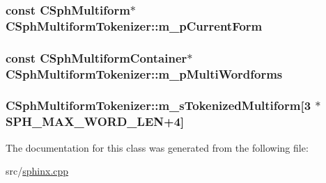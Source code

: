 \hypertarget{classCSphMultiformTokenizer_a37d850185d9bdf79433c4d01db6d462e}{
\subsubsection[{m\-\_\-p\-Current\-Form}]{\setlength{\rightskip}{0pt plus 5cm}const {\bf C\-Sph\-Multiform}$\ast$ C\-Sph\-Multiform\-Tokenizer\-::m\-\_\-p\-Current\-Form\hspace{0.3cm}{\ttfamily [private]}}}\label{classCSphMultiformTokenizer_a37d850185d9bdf79433c4d01db6d462e}
\hypertarget{classCSphMultiformTokenizer_a9e487f015bd6e629a35786dbd85ff482}{
\subsubsection[{m\-\_\-p\-Multi\-Wordforms}]{\setlength{\rightskip}{0pt plus 5cm}const {\bf C\-Sph\-Multiform\-Container}$\ast$ C\-Sph\-Multiform\-Tokenizer\-::m\-\_\-p\-Multi\-Wordforms\hspace{0.3cm}{\ttfamily [private]}}}\label{classCSphMultiformTokenizer_a9e487f015bd6e629a35786dbd85ff482}
\hypertarget{classCSphMultiformTokenizer_a646c1bcb629e8ab9fd655ef1fac1e35a}{
\subsubsection[{m\-\_\-s\-Tokenized\-Multiform}]{ C\-Sph\-Multiform\-Tokenizer\-::m\-\_\-s\-Tokenized\-Multiform\mbox{[}3 $\ast${\bf S\-P\-H\-\_\-\-M\-A\-X\-\_\-\-W\-O\-R\-D\-\_\-\-L\-E\-N}+4\mbox{]}\hspace{0.3cm}{\ttfamily [private]}}}\label{classCSphMultiformTokenizer_a646c1bcb629e8ab9fd655ef1fac1e35a}


The documentation for this class was generated from the following file\-:\begin{DoxyCompactItemize}
\item 
src/\hyperlink{sphinx_8cpp}{sphinx.\-cpp}\end{DoxyCompactItemize}
